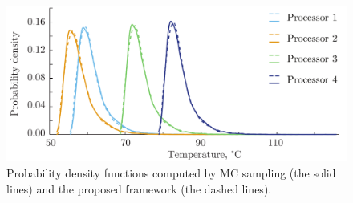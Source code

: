 \begin{figure}
  \centering
  \includegraphics[width=1.0\linewidth]{include/assets/experimental-results-pdf.pdf}
  \vspace{-1.5em}
  \caption{Probability density functions computed by MC sampling (the solid lines) and the proposed framework (the dashed lines).}
  \vspace{-1.0em}
\end{figure}
